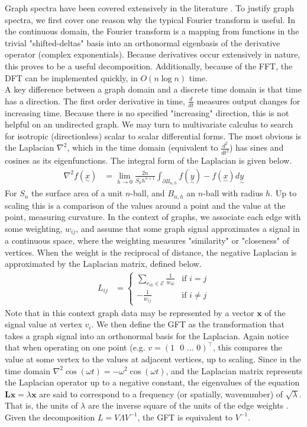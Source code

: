 \documentclass[12pt,a4paper]{article} %
\newcommand{\ve}[1]{\underset{\sim}{#1}}
\begin{document}
Graph spectra have been covered extensively in the literature \cite{moura}\cite{mand}. To justify graph spectra, we first cover one reason why the typical Fourier transform is useful. In the continuous domain, the Fourier transform is a mapping from functions in the trivial "shifted-deltas" basis into an orthonormal eigenbasis of the derivative operator (complex exponentials). Because derivatives occur extensively in nature, this proves to be a useful decomposition. Additionally, because of the FFT, the DFT can be implemented quickly, in $O(n\log n)$ time.\\

A key difference between a graph domain and a discrete time domain is that time has a direction. The first order derivative in time, $\frac{d}{dt}$ measures output changes for increasing time. Because there is no specified "increasing" direction, this is not helpful on an undirected graph. We may turn to multivariate calculus to search for isotropic (directionless) scalar to scalar differential forms. The most obvious is the Laplacian $\nabla^2$, which in the time domain (equivalent to $\frac{d^2}{dt^2}$) has sines and cosines as its eigenfunctions. The integral form of the Laplacian is given below.
\begin{align*}
    \nabla^2f(\ve{x})&=\lim_{h\to0}\frac{2n}{S_nh^{n+1}}\int_{\partial B_{n,h}}f(\ve{y})-f(\ve{x})d\ve{y}
\end{align*}
For $S_n$ the surface area of a unit $n$-ball, and $B_{n,h}$ an $n$-ball with radius $h$. Up to scaling this is a comparison of the values around a point and the value at the point, measuring curvature. In the context of graphs, we associate each edge with some weighting, $w_{ij}$, and assume that some graph signal approximates a signal in a continuous space, where the weighting measures "similarity" or "closeness" of vertices. When the weight is the reciprocal of distance, the negative Laplacian is approximated by the Laplacian matrix, defined below.
\begin{align*}
    L_{ij}&=\begin{cases}
        \sum_{e_{ik}\in\mathcal{E}}\frac{1}{w_{ik}}&\text{if }i=j\\
        -\frac{1}{w_{ij}}&\text{if }i\neq j
    \end{cases}
\end{align*}
Note that in this context graph data may be represented by a vector $\textbf{x}$ of the signal value at vertex $v_i$. We then define the GFT as the transformation that takes a graph signal into an orthonormal basis for the Laplacian. Again notice that when operating on one point (e.g. $v=(1\text{ }0\text{ ... }0)^\top$, this compares the value at some vertex to the values at adjacent vertices, up to scaling. Since in the time domain $\nabla^2\cos(\omega t)=-\omega^2\cos(\omega t)$, and the Laplacian matrix represents the Laplacian operator up to a negative constant, the eigenvalues of the equation $\mathbf{Lx}=\lambda\mathbf{x}$ are said to correspond to a frequency (or spatially, wavenumber) of $\sqrt{\lambda}$. That is, the units of $\lambda$ are the inverse square of the units of the edge weights \cite{mand}. Given the decomposition $L=V\Lambda V^{-1}$, the GFT is equivalent to $V^{-1}$.\\
\end{document}

